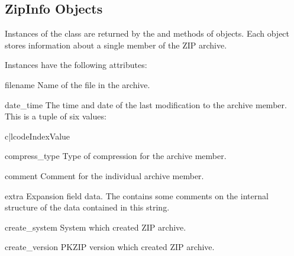 \subsection{ZipInfo Objects \label{zipinfo-objects}}

Instances of the  class are returned by the
 and  methods of
 objects.  Each object stores information about a
single member of the ZIP archive.

Instances have the following attributes:

\begin{memberdesc}[ZipInfo]{filename}
  Name of the file in the archive.
\end{memberdesc}

\begin{memberdesc}[ZipInfo]{date_time}
  The time and date of the last modification to the archive
  member.  This is a tuple of six values:

\begin{tableii}{c|l}{code}{Index}{Value}
\end{tableii}
\end{memberdesc}

\begin{memberdesc}[ZipInfo]{compress_type}
  Type of compression for the archive member.
\end{memberdesc}

\begin{memberdesc}[ZipInfo]{comment}
  Comment for the individual archive member.
\end{memberdesc}

\begin{memberdesc}[ZipInfo]{extra}
  Expansion field data.  The
   contains some comments on the internal
  structure of the data contained in this string.
\end{memberdesc}

\begin{memberdesc}[ZipInfo]{create_system}
  System which created ZIP archive.
\end{memberdesc}

\begin{memberdesc}[ZipInfo]{create_version}
  PKZIP version which created ZIP archive.
\end{memberdesc}

